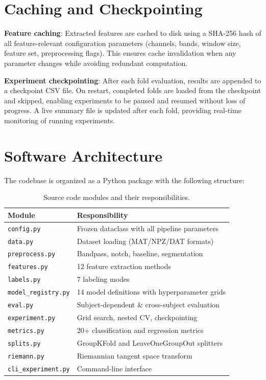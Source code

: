 \documentclass[12pt,a4paper]{report}
\begin{document}
\section{Caching and Checkpointing}
\label{sec:caching}

\textbf{Feature caching}: Extracted features are cached to disk using a SHA-256
hash of all feature-relevant configuration parameters (channels, bands, window
size, feature set, preprocessing flags). This ensures cache invalidation when
any parameter changes while avoiding redundant computation.

\textbf{Experiment checkpointing}: After each fold evaluation, results are
appended to a checkpoint CSV file. On restart, completed folds are loaded from
the checkpoint and skipped, enabling experiments to be paused and resumed
without loss of progress. A live summary file is updated after each fold,
providing real-time monitoring of running experiments.


\section{Software Architecture}

The codebase is organized as a Python package with the following structure:

\begin{table}[H]
\centering
\caption{Source code modules and their responsibilities.}
\label{tab:modules}
\begin{tabular}{lp{9cm}}
\toprule
\textbf{Module} & \textbf{Responsibility} \\
\midrule
\texttt{config.py}          & Frozen dataclass with all pipeline parameters \\
\texttt{data.py}            & Dataset loading (MAT/NPZ/DAT formats) \\
\texttt{preprocess.py}      & Bandpass, notch, baseline, segmentation \\
\texttt{features.py}        & 12 feature extraction methods \\
\texttt{labels.py}          & 7 labeling modes \\
\texttt{model\_registry.py} & 14 model definitions with hyperparameter grids \\
\texttt{eval.py}            & Subject-dependent \& cross-subject evaluation \\
\texttt{experiment.py}      & Grid search, nested CV, checkpointing \\
\texttt{metrics.py}         & 20+ classification and regression metrics \\
\texttt{splits.py}          & GroupKFold and LeaveOneGroupOut splitters \\
\texttt{riemann.py}         & Riemannian tangent space transform \\
\texttt{cli\_experiment.py} & Command-line interface \\
\bottomrule
\end{tabular}
\end{table}
\end{document}
